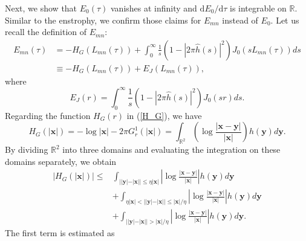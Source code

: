 \documentclass{article}
\theoremstyle{definition}
\begin{document}
Next, we show that $E_0(\tau)$ vanishes at infinity and $\mbox{d}E_0/\mbox{d}\tau$ is integrable on $\mathbb{R}$. Similar to the enstrophy, we confirm those claims for $E_{mn}$ instead of $E_0$. Let us recall the definition of $E_{mn}$:
\begin{align*}
E_{mn}(\tau) &= - H_G\left( L_{mn}(\tau) \right) +  \int_0^\infty \frac{1}{s} \left( 1 - \left\vert 2\pi\widehat{h}(s) \right\vert^2 \right) J_0 \left( s L_{mn}(\tau) \right) ds \\
& \equiv - H_G\left( L_{mn}(\tau) \right) + E_J\left( L_{mn}(\tau) \right),
\end{align*}
where
\begin{equation}
E_J(r) = \int_0^\infty \frac{1}{s} \left( 1 - \left\vert 2\pi\widehat{h}(s) \right\vert^2 \right) J_0 \left( s r \right) ds. 
\label{E_J}
\end{equation}
Regarding the function $H_G(r)$ in (\ref{H_G}), we have
\begin{equation*}
H_G(\vert{\bm x}\vert) = - \log{\vert{\bm x}\vert} - 2 \pi G_r^1(\vert{\bm x}\vert) = \int_{\mathbb{R}^2} \left( \log{\frac{\vert{\bm x} - {\bm y}\vert}{\vert{\bm x}\vert}} \right) h({\bm y}) d{\bm y}.
\end{equation*}
By dividing $\mathbb{R}^2$ into three domains and evaluating the integration on these domains separately, we obtain
\begin{align*}
\left\vert H_G(\vert{\bm x}\vert) \right\vert \leq& \int_{ \vert\vert{\bm y}\vert - \vert{\bm x}\vert\vert \leq \eta \vert{\bm x}\vert} \left\vert \log{\frac{\vert{\bm x} - {\bm y}\vert}{\vert{\bm x}\vert}} \right\vert h({\bm y}) d{\bm y} \\
& + \int_{ \eta \vert{\bm x}\vert < \vert\vert{\bm y}\vert - \vert{\bm x}\vert\vert \leq \vert{\bm x}\vert/ \eta} \left\vert \log{\frac{\vert{\bm x} - {\bm y}\vert}{\vert{\bm x}\vert}} \right\vert h({\bm y}) d{\bm y} \\
& + \int_{ \vert\vert{\bm y}\vert - \vert{\bm x}\vert\vert > \vert{\bm x}\vert/ \eta} \left\vert \log{\frac{\vert{\bm x} - {\bm y}\vert}{\vert{\bm x}\vert}} \right\vert h({\bm y}) d{\bm y}.
\end{align*}
The first term is estimated as
\end{document}
